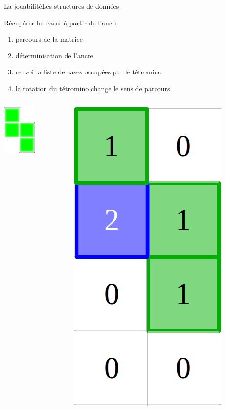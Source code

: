 \documentclass[french]{beamer}
\begin{document}
			\begin{frame}{La jouabilité}{Les structures de données}	

				\begin{block}{Récupérer les cases à partir de l'ancre}
					\begin{enumerate}
						\item parcours de la matrice
						\item déterminisation de l'ancre
						\item renvoi la liste de cases occupées par le tétromino
						\item la rotation du tétromino change le sens de parcours
					\end{enumerate}
				\end{block}
				
				\begin{columns}
					\begin{column}{0.1\textwidth}
						\begin{center}
							\includegraphics[scale=0.5]{img/2.png}
						\end{center}
					\end{column}
					\begin{column}{0.1\textwidth}
						\begin{center}
							\includegraphics[scale=0.1]{img/tetro.png}
						\end{center}
					\end{column}
				\end{columns}
			\end{frame}
\end{document}
